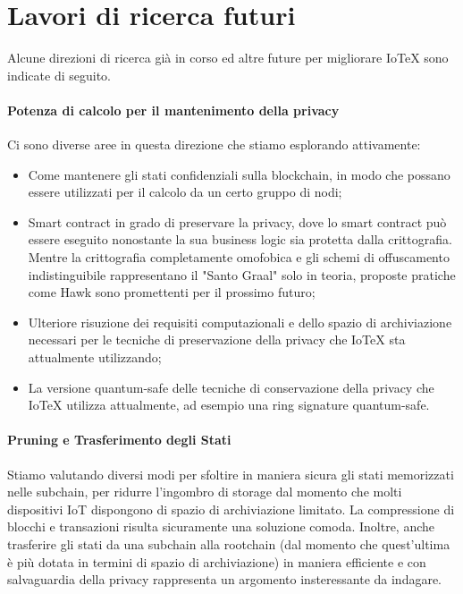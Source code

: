 \section{Lavori di ricerca futuri}
Alcune direzioni di ricerca già in corso ed altre future per migliorare IoTeX sono indicate di seguito.

\paragraph{Potenza di calcolo per il mantenimento della privacy}
Ci sono diverse aree in questa direzione che stiamo esplorando attivamente:

\begin{itemize}
    \item Come mantenere gli stati confidenziali sulla blockchain, in modo che possano essere utilizzati per il calcolo da un certo gruppo di nodi;

\item Smart contract in grado di preservare la privacy, dove lo smart contract può essere eseguito nonostante la sua business logic sia protetta dalla crittografia. Mentre la crittografia completamente omofobica \cite{c26} e gli schemi di offuscamento indistinguibile \cite{c11} rappresentano il "Santo Graal" solo in teoria, proposte pratiche come Hawk \cite{c17} sono promettenti per il prossimo futuro;

\item Ulteriore risuzione dei requisiti computazionali e dello spazio di archiviazione necessari per le tecniche di preservazione della privacy che IoTeX sta attualmente utilizzando;

\item La versione quantum-safe delle tecniche di conservazione della privacy che IoTeX utilizza attualmente, ad esempio una ring signature quantum-safe.
\end{itemize}


\paragraph{Pruning e Trasferimento degli Stati}
Stiamo valutando diversi modi per sfoltire in maniera sicura gli stati memorizzati nelle subchain, per ridurre l'ingombro di storage dal momento che molti dispositivi IoT dispongono di spazio di archiviazione limitato. La compressione di blocchi e transazioni risulta sicuramente una soluzione comoda. Inoltre, anche trasferire gli stati da una subchain alla rootchain (dal momento che quest'ultima è più dotata in termini di spazio di archiviazione) in maniera efficiente e con salvaguardia della privacy rappresenta un argomento insteressante da indagare.

